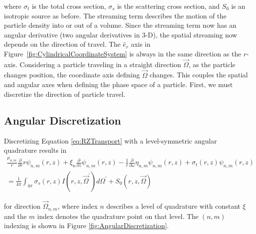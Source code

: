 \documentclass[12pt]{article}
\begin{document}
\noindent where $\sigma_t$ is the total cross section, $\sigma_s$ is the scattering cross section, and $S_0$ is an isotropic source as before. The streaming term describes the motion of the particle density into or out of a volume. Since the streaming term now has an angular derivative (two angular derivatives in 3-D), the spatial streaming now depends on the direction of travel. The $\hat{e}_r$ axis in Figure~\ref{fig:CylindricalCoordinateSystem} is always in the same direction as the $r$-axis. Considering a particle traveling in a straight direction $\vec{\Omega}$, as the particle changes position, the coordinate axis defining $\vec{\Omega}$ changes. This couples the spatial and angular axes when defining the phase space of a particle. First, we must discretize the direction of particle travel.

\subsection{Angular Discretization}
Discretizing Equation \ref{eq:RZTransport} with a level-symmetric angular quadrature results in 
\begin{multline}
\frac{\mu_{n,m}}{r} \frac{\partial}{\partial r} r \psi_{n,m} \left(r,z \right) + \xi_n \frac{\partial}{\partial z} \psi_{n,m} \left(r,z \right) - \frac{1}{r} \frac{\partial}{\partial \omega} \eta_{n,m} \psi_{n,m} \left(r,z \right) + \sigma_t \left(r,z \right) \psi_{n,m} \left(r,z \right) \\
= \frac{1}{4 \pi} \int_{4 \pi} \sigma_s \left(r,z \right) I \left(r,z, \vec{\Omega}^\prime \right) d \Omega^\prime + S_0 \left(r,z, \vec{\Omega} \right)
\label{eq:RZSNTransport}
\end{multline}

\noindent for direction $\vec{\Omega}_{n,m}$, where index $n$ describes a level of quadrature with constant $\xi$ and the $m$ index denotes the quadrature point on that level. The $(n,m)$ indexing is shown in Figure \ref{fig:AngularDiscretization}.
\end{document}
